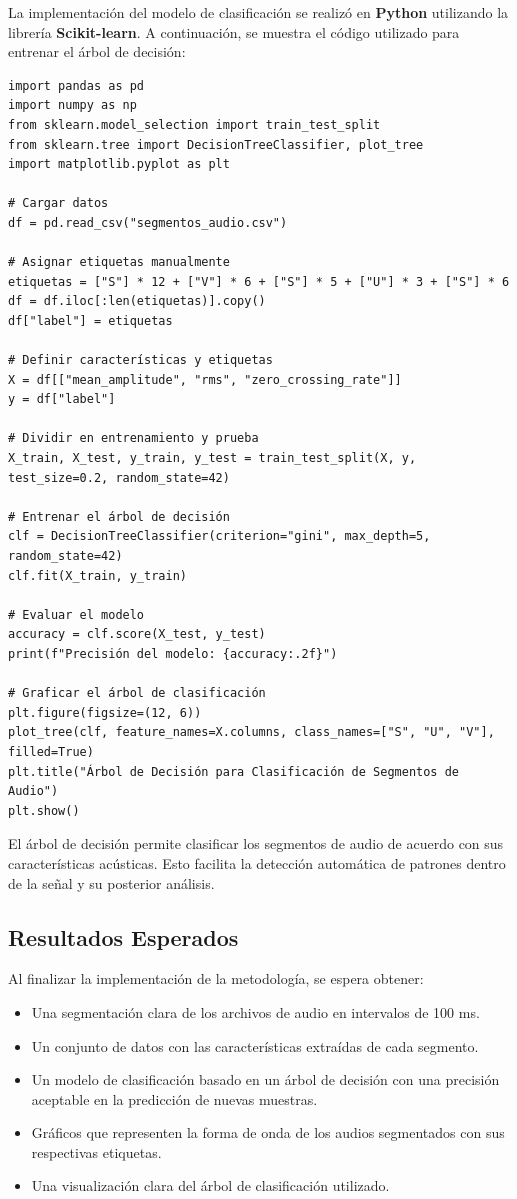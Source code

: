 \documentclass{report}
\begin{document}
La implementación del modelo de clasificación se realizó en \textbf{Python} utilizando la librería \textbf{Scikit-learn}. A continuación, se muestra el código utilizado para entrenar el árbol de decisión:
\begin{verbatim}
import pandas as pd
import numpy as np
from sklearn.model_selection import train_test_split
from sklearn.tree import DecisionTreeClassifier, plot_tree
import matplotlib.pyplot as plt

# Cargar datos
df = pd.read_csv("segmentos_audio.csv")

# Asignar etiquetas manualmente
etiquetas = ["S"] * 12 + ["V"] * 6 + ["S"] * 5 + ["U"] * 3 + ["S"] * 6
df = df.iloc[:len(etiquetas)].copy()
df["label"] = etiquetas

# Definir características y etiquetas
X = df[["mean_amplitude", "rms", "zero_crossing_rate"]]
y = df["label"]

# Dividir en entrenamiento y prueba
X_train, X_test, y_train, y_test = train_test_split(X, y, test_size=0.2, random_state=42)

# Entrenar el árbol de decisión
clf = DecisionTreeClassifier(criterion="gini", max_depth=5, random_state=42)
clf.fit(X_train, y_train)

# Evaluar el modelo
accuracy = clf.score(X_test, y_test)
print(f"Precisión del modelo: {accuracy:.2f}")

# Graficar el árbol de clasificación
plt.figure(figsize=(12, 6))
plot_tree(clf, feature_names=X.columns, class_names=["S", "U", "V"], filled=True)
plt.title("Árbol de Decisión para Clasificación de Segmentos de Audio")
plt.show()
\end{verbatim}

El árbol de decisión permite clasificar los segmentos de audio de acuerdo con sus características acústicas. Esto facilita la detección automática de patrones dentro de la señal y su posterior análisis.

\subsection{Resultados Esperados}

Al finalizar la implementación de la metodología, se espera obtener:

\begin{itemize}
    \item Una segmentación clara de los archivos de audio en intervalos de 100 ms.
    \item Un conjunto de datos con las características extraídas de cada segmento.
    \item Un modelo de clasificación basado en un árbol de decisión con una precisión aceptable en la predicción de nuevas muestras.
    \item Gráficos que representen la forma de onda de los audios segmentados con sus respectivas etiquetas.
    \item Una visualización clara del árbol de clasificación utilizado.
\end{itemize}
\end{document}
